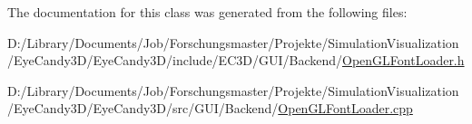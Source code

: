 The documentation for this class was generated from the following files\+:\begin{DoxyCompactItemize}
\item 
D\+:/\+Library/\+Documents/\+Job/\+Forschungsmaster/\+Projekte/\+Simulation\+Visualization/\+Eye\+Candy3\+D/\+Eye\+Candy3\+D/include/\+E\+C3\+D/\+G\+U\+I/\+Backend/\mbox{\hyperlink{_open_g_l_font_loader_8h}{Open\+G\+L\+Font\+Loader.\+h}}\item 
D\+:/\+Library/\+Documents/\+Job/\+Forschungsmaster/\+Projekte/\+Simulation\+Visualization/\+Eye\+Candy3\+D/\+Eye\+Candy3\+D/src/\+G\+U\+I/\+Backend/\mbox{\hyperlink{_open_g_l_font_loader_8cpp}{Open\+G\+L\+Font\+Loader.\+cpp}}\end{DoxyCompactItemize}
